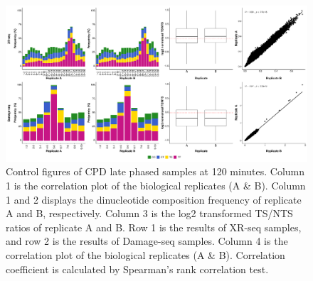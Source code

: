 \begin{figure}[H]
    \begin{center}
    \includegraphics[width=\textwidth]{Chapters/7_appendix/figures/supfig9}
    \caption[Control figures of CPD late phased samples at 120 minutes.]{Control figures of CPD late phased samples at 120 minutes. Column 1 is the correlation plot of the biological replicates (A \& B). Column 1 and 2 displays the dinucleotide composition frequency of replicate A and B, respectively. Column 3 is the log2 transformed TS/NTS ratios of replicate A and B. Row 1 is the results of XR-seq samples, and row 2 is the results of Damage-seq samples. Column 4 is the correlation plot of the biological replicates (A \& B). Correlation coefficient is calculated by Spearman’s rank correlation test.}
    \label{supfig:control8}
    \end{center}
    \end{figure}

